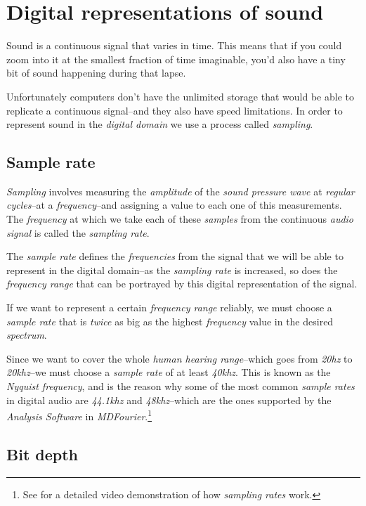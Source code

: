 \documentclass[10pt,a4paper]{report}
\newcommand{\hz}[1]{\textit{#1\acrshort{hz}}}
\newcommand{\khz}[1]{\textit{#1\acrshort{khz}}}
\begin{document}
\section{Digital representations of sound}

Sound is a continuous signal that varies in time. This means that if you could zoom into it at the smallest fraction of time imaginable, you'd also have a tiny bit of sound happening during that lapse. 

Unfortunately computers don't have the unlimited storage that would be able to replicate a continuous signal--and they also have speed limitations. In order to represent sound in the \textit{digital domain} we use a process called \textit{sampling}. 

\subsection{Sample rate}

\textit{Sampling} involves measuring the \textit{amplitude} of the \textit{sound pressure wave} at \textit{regular cycles}--at a \textit{frequency}--and assigning a value to each one of this measurements. The \textit{frequency} at which we take each of these \textit{samples} from the continuous \textit{audio signal} is called the \textit{sampling rate}. 

The \textit{sample rate} defines the \textit{frequencies} from the signal that we will be able to represent in the digital domain--as the \textit{sampling rate} is increased, so does the \textit{frequency range} that can be portrayed by this digital representation of the signal. 

If we want to represent a certain \textit{frequency range} reliably, we must choose a \textit{sample rate} that is \textit{twice} as big as the highest \textit{frequency} value in the desired \textit{spectrum}.

Since we want to cover the whole \textit{human hearing range}--which goes from \hz{20} to \khz{20}--we must choose a \textit{sample rate} of at least \khz{40}. This is known as the \textit{Nyquist frequency}, and is the reason why some of the most common \textit{sample rates} in digital audio are \khz{44.1} and \khz{48}--which are the ones supported by the \textit{Analysis Software} in \textit{MDFourier}.\footnote{See \cite{MontyMontgomery} for a detailed video demonstration of how \textit{sampling rates} work.}


\subsection{Bit depth}
\end{document}
